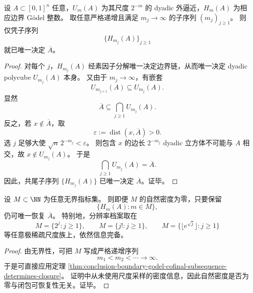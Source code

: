 \begin{theorem}\label{thm:conclusion-boundary-godel-cofinal-subsequence-determines-closure}
设 \(A\subset [0,1]^n\) 任意，\(U_m(A)\) 为其尺度 \(2^{-m}\) 的 dyadic 外逼近，\(H_m(A)\) 为相应边界 Gödel 整数。
取任意严格递增且满足 \(m_j\to\infty\) 的子序列 \((m_j)_{j\ge 1}\)。
则仅凭子序列
\[
\{H_{m_j}(A)\}_{j\ge 1}
\]
就已唯一决定 \(\overline A\)。
\end{theorem}
\begin{proof}
对每个 \(j\)，\(H_{m_j}(A)\) 经素因子分解唯一决定边界链，从而唯一决定 dyadic polycube \(U_{m_j}(A)\) 本身。
又由于 \(m_j\to\infty\)，有嵌套
\[
U_{m_{j+1}}(A)\subseteq U_{m_j}(A).
\]
显然
\[
\overline A\subseteq \bigcap_{j\ge1}U_{m_j}(A).
\]
反之，若 \(x\notin \overline A\)，取
\[
\varepsilon:=\operatorname{dist}(x,\overline A)>0.
\]
选 \(j\) 足够大使 \(\sqrt n\,2^{-m_j}<\varepsilon\)。
则包含 \(x\) 的边长 \(2^{-m_j}\) dyadic 立方体不可能与 \(A\) 相交，故 \(x\notin U_{m_j}(A)\)。
于是
\[
\bigcap_{j\ge1}U_{m_j}(A)=\overline A.
\]
因此，共尾子序列 \(\{H_{m_j}(A)\}\) 已唯一决定 \(\overline A\)。证毕。
\end{proof}

\begin{corollary}[零密度分辨率档案仍然信息完备]\label{cor:conclusion-boundary-godel-zero-density-resolution-archive-complete}
设 \(M\subset \NN\) 为任意无界指标集。
则即便 \(M\) 的自然密度为零，只要保留
\[
\{H_m(A):m\in M\},
\]
仍可唯一恢复 \(\overline A\)。
特别地，分辨率档案取在
\[
M=\{2^j:j\ge1\},
\qquad
M=\{j!:j\ge1\},
\qquad
M=\{\lfloor e^{\sqrt j}\rfloor:j\ge1\}
\]
等任意极稀疏尺度族上，依然信息完备。
\end{corollary}
\begin{proof}
由无界性，可把 \(M\) 写成严格递增序列
\[
m_1<m_2<\cdots\to\infty.
\]
于是可直接应用定理 \ref{thm:conclusion-boundary-godel-cofinal-subsequence-determines-closure}。
证明中从未使用尺度采样的密度信息，因此自然密度是否为零与闭包可恢复性无关。证毕。
\end{proof}

